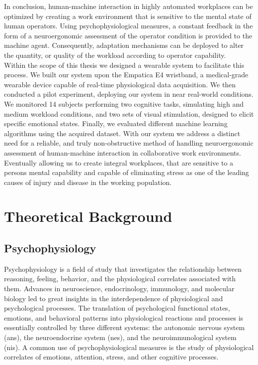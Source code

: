 In conclusion, human-machine interaction in highly automated workplaces can be optimized by creating a work environment that is sensitive to the mental state of human operators. Using psychophysiological measures, a constant feedback in the form of a neuroergonomic assessment of the operator condition is provided to the machine agent. Consequently, adaptation mechanisms can be deployed to alter the quantity, or quality of the workload according to operator capability.\\ 
Within the scope of this thesis we designed a wearable system to facilitate this process. We built our system upon the Empatica E4 wristband, a medical-grade wearable device capable of real-time physiological data acquisition. We then conducted a pilot experiment, deploying our system in near real-world conditions. We monitored 14 subjects performing two cognitive tasks, simulating high and medium workload conditions, and two sets of visual stimulation, designed to elicit specific emotional states. Finally, we evaluated different machine learning algorithms using the acquired dataset. With our system we address a distinct need for a reliable, and truly non-obstructive method of handling neuroergonomic assessment of human-machine interaction in collaborative work environments. Eventually allowing us to create integral workplaces, that are sensitive to a persons mental capability and capable of eliminating stress as one of the leading causes of injury and disease in the working population.
\section{Theoretical Background}
\subsection{Psychophysiology}
Psychophysiology is a field of study that investigates the relationship between reasoning, feeling, behavior, and the physiological correlates associated with them. Advances in neuroscience, endocrinology, immunology, and molecular biology led to great insights in the interdependence of physiological and psychological processes. The translation of psychological functional states, emotions, and behavioral patterns into physiological reactions and processes is essentially controlled by three different systems: the autonomic nervous system (\gls{ans}), the neuroendocrine system (\gls{nes}), and the neuroimmunological system (\gls{nis}). A common use of psychophysiological measures is the study of physiological correlates of emotions, attention, stress, and other cognitive processes.  

